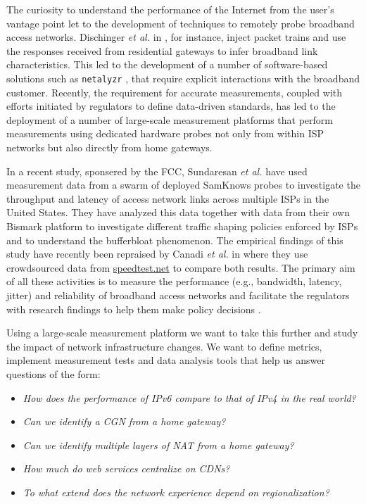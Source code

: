 The curiosity to understand the performance of the Internet from the user's
vantage point let to the development of techniques to remotely probe broadband
access networks. Dischinger \emph{et al.} in \cite{dischinger:2007}, for
instance, inject packet trains and use the responses received from residential
gateways to infer broadband link characteristics. This led to the development
of a number of software-based solutions such as \texttt{netalyzr}
\cite{kreibich:2010}, that require explicit interactions with the broadband
customer. Recently, the requirement for accurate measurements, coupled with
efforts initiated by regulators to define data-driven standards, has led to
the deployment of a number of large-scale measurement platforms that perform
measurements using dedicated hardware probes not only from within \ac{ISP}
networks but also directly from home gateways.

In a recent study, sponsered by the \ac{FCC}, Sundaresan \emph{et al.}
\cite{sundaresan:2011} have used measurement data from a swarm of deployed
SamKnows probes to investigate the throughput and latency of access network
links across multiple \ac{ISP}s in the United States. They have analyzed this
data together with data from their own Bismark platform \cite{sundaresan:2012}
to investigate different traffic shaping policies enforced by \ac{ISP}s and to
understand the bufferbloat phenomenon. The empirical findings of this study
have recently been repraised by Canadi \emph{et al.} in \cite{canadi:2012}
where they use crowdsourced data from \url{speedtest.net} to compare both
results. The primary aim of all these activities is to measure the performance
(e.g., bandwidth, latency, jitter) and reliability of broadband access
networks and facilitate the regulators with research findings to help them
make policy decisions \cite{draft-schulzrinne-lmap-requirements-00}.

Using a large-scale measurement platform we want to take this further and
study the impact of network infrastructure changes. We want to define metrics,
implement measurement tests and data analysis tools that help us answer
questions of the form:

\begin{itemize}
  \item \emph{How does the performance of IPv6 compare to that of IPv4 in the real world?}
  \item \emph{Can we identify a \ac{CGN} from a home gateway?}
  \item \emph{Can we identify multiple layers of NAT from a home gateway?}
  \item \emph{How much do web services centralize on \ac{CDN}s?}
  \item \emph{To what extend does the network experience depend on regionalization?}
\end{itemize}

